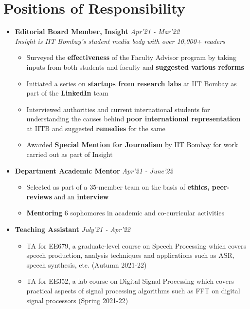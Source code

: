 \documentclass[10pt,letterpaper,sans]{moderncv}
\providecommand{\sl}{\slshape}
\begin{document}
\section{Positions of Responsibility}
\begin{itemize}
\item \textbf{Editorial Board Member, Insight} \hfill{\sl Apr'21 - Mar'22}\\
\textit{Insight is IIT Bombay's student media body with over 10,000+ readers}
\begin{itemize}
\item Surveyed the \textbf{effectiveness} of the Faculty Advisor program by taking inputs from both students and faculty and \textbf{suggested various reforms}
\item Initiated a series on \textbf{startups from research labs} at IIT Bombay as part of the \textbf{LinkedIn} team
\item Interviewed authorities and current international students for understanding the causes behind \textbf{poor international representation} at IITB and suggested \textbf{remedies} for the same
\item Awarded \textbf{Special Mention for Journalism} by IIT Bombay for work carried out as part of Insight
\end{itemize}
\vspace{5pt}
\item \textbf{Department Academic Mentor} \hfill{\sl Apr'21 - June'22}\\
\vspace{-10pt}
\begin{itemize}
\item Selected as part of a 35-member team on the basis of \textbf{ethics, peer-reviews} and an \textbf{interview}
\item \textbf{Mentoring} 6 sophomores in academic and co-curricular activities
\end{itemize}
\vspace{5pt}
\item \textbf{Teaching Assistant} \hfill{\sl July'21 - Apr'22}\\
\vspace{-10pt}

\begin{itemize}
\item TA for EE679, a graduate-level course on Speech Processing which covers speech production, analysis techniques and applications such as ASR, speech synthesis, etc. (Autumn 2021-22)
\item TA for EE352, a lab course on Digital Signal Processing which covers practical aspects of signal processing algorithms such as FFT on digital signal processors (Spring 2021-22)
\end{itemize}
\end{itemize}
\vspace{-10pt}
\end{document}
